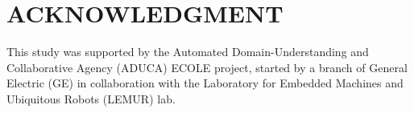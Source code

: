 \documentclass[letterpaper, 10 pt, conference]{ieeeconf}  %
\begin{document}
\addtolength{\textheight}{-12cm}   %








\section*{ACKNOWLEDGMENT}
This study was supported by the Automated Domain-Understanding and Collaborative Agency (ADUCA) ECOLE project, started by a branch of General Electric (GE) in collaboration with the Laboratory for Embedded Machines and Ubiquitous Robots (LEMUR) lab.


\end{document}
